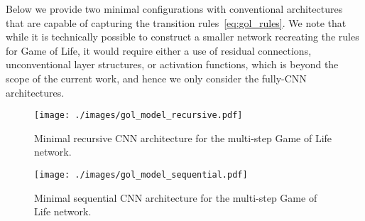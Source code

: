 \documentclass[letterpaper]{article} %
\begin{document}
Below we provide two minimal configurations with conventional architectures that are capable of capturing the transition rules~\eqref{eq:gol_rules}.
We note that while it is technically possible to construct a smaller network recreating the rules for Game of Life, it would require either a use of residual connections, unconventional layer structures, or activation functions, which is beyond the scope of the current work, and hence we only consider the fully-CNN architectures.


\begin{figure*}[t]
    \centering
    \texttt{[image: ./images/gol\_model\_recursive.pdf]}
    \caption{Minimal recursive CNN architecture for the multi-step Game of Life network.}
    \label{fig:gol_model_recursive}
\end{figure*}

\begin{figure*}[t]
    \centering
    \texttt{[image: ./images/gol\_model\_sequential.pdf]}
    \caption{Minimal sequential CNN architecture for the multi-step Game of Life network.}
    \label{fig:gol_model_sequential}
\end{figure*}
\end{document}
